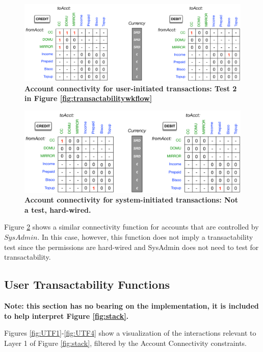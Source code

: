 \begin{figure}[h]
\vspace{-0.5cm}
\centering
\includegraphics[width=16cm]{Figures/User_Acct_Connectivity}
\caption{\small\textbf{Account connectivity for user-initiated transactions: Test 2 in Figure \ref{fig:transactabilitywkflow}}}
\label{fig:User_Acct_Connectivity}
\end{figure}

\begin{figure}[H]
\vspace{-0.5cm}
\centering
\includegraphics[width=16cm]{Figures/SysAdmin_Acct_Connectivity}
\caption{\small\textbf{Account connectivity for system-initiated transactions: Not a test, hard-wired. }}
\label{fig:SysAdmin_Acct_Connectivity}
\end{figure}

Figure \ref{fig:SysAdmin_Acct_Connectivity} shows a similar connectivity function for accounts that are controlled by $SysAdmin$. In this case, however, this function does not imply a transactability test since the permissions are hard-wired and SysAdmin does not need to test for transactability.

\subsection{User Transactability Functions}
\textbf{\small Note: this section has no bearing on the implementation, it is included to help interpret Figure \ref{fig:stack}.}

Figures \ref{fig:UTF1}-\ref{fig:UTF4} show a visualization of the interactions relevant to Layer 1 of Figure \ref{fig:stack}, filtered by the Account Connectivity constraints.

